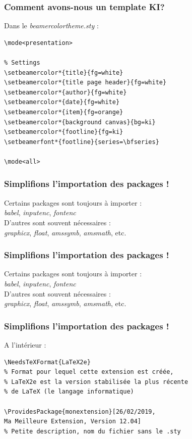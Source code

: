 \documentclass[handout]{beamer}
\begin{document}
\begin{frame}[fragile=singleslide]
\frametitle{Comment avons-nous un template KI?}
Dans le \textit{beamercolortheme.sty} :
\begin{verbatim}
\mode<presentation>

% Settings
\setbeamercolor*{title}{fg=white}
\setbeamercolor*{title page header}{fg=white}
\setbeamercolor*{author}{fg=white}
\setbeamercolor*{date}{fg=white}
\setbeamercolor*{item}{fg=orange}
\setbeamercolor*{background canvas}{bg=ki}
\setbeamercolor*{footline}{fg=ki}
\setbeamerfont*{footline}{series=\bfseries}

\mode<all>
\end{verbatim}
\end{frame}

\begin{frame}
\frametitle{Simplifions l'importation des packages !}
Certains packages sont toujours à importer : \\ \textit{babel}, \textit{inputenc}, \textit{fontenc}\\
D'autres sont souvent nécessaires : \\
\textit{graphicx}, \textit{float}, \textit{amssymb}, \textit{amsmath}, etc.
\end{frame}

\begin{frame}
\frametitle{Simplifions l'importation des packages !}
Certains packages sont toujours à importer : \\ \textit{babel}, \textit{inputenc}, \textit{fontenc}\\
D'autres sont souvent nécessaires : \\
\textit{graphicx}, \textit{float}, \textit{amssymb}, \textit{amsmath}, etc.\\

\hspace{5em}
\end{frame}

\begin{frame}[fragile=singleslide]
\frametitle{Simplifions l'importation des packages !}
A l'intérieur :\\
\begin{verbatim}
\NeedsTeXFormat{LaTeX2e} 
% Format pour lequel cette extension est créée,
% LaTeX2e est la version stabilisée la plus récente 
% de LaTeX (le langage informatique)

\ProvidesPackage{monextension}[26/02/2019, 
Ma Meilleure Extension, Version 12.04] 
% Petite description, nom du fichier sans le .sty
\end{verbatim}
\end{frame}
\end{document}

